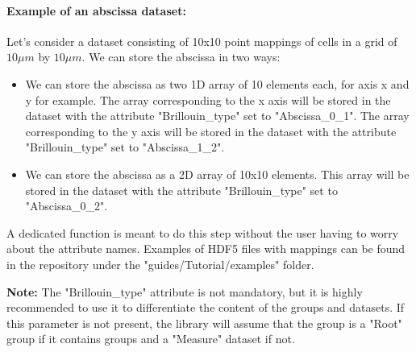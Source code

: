 \paragraph{Example of an abscissa dataset:}
Let's consider a dataset consisting of 10x10 point mappings of cells in a grid of $10\mu m$ by $10\mu m$. We can store the abscissa in two ways:
\begin{itemize}
    \item We can store the abscissa as two 1D array of 10 elements each, for axis x and y for example. The array corresponding to the x axis will be stored in the dataset with the attribute "Brillouin\_type" set to "Abscissa\_0\_1". The array corresponding to the y axis will be stored in the dataset with the attribute "Brillouin\_type" set to "Abscissa\_1\_2".
    \item We can store the abscissa as a 2D array of 10x10 elements. This array will be stored in the dataset with the attribute "Brillouin\_type" set to "Abscissa\_0\_2".
\end{itemize}
A dedicated function is meant to do this step without the user having to worry about the attribute names. Examples of HDF5 files with mappings can be found in the repository under the "guides/Tutorial/examples" folder.

\textbf{Note:} The "Brillouin\_type" attribute is not mandatory, but it is highly recommended to use it to differentiate the content of the groups and datasets. If this parameter is not present, the library will assume that the group is a "Root" group if it contains groups and a "Measure" dataset if not.